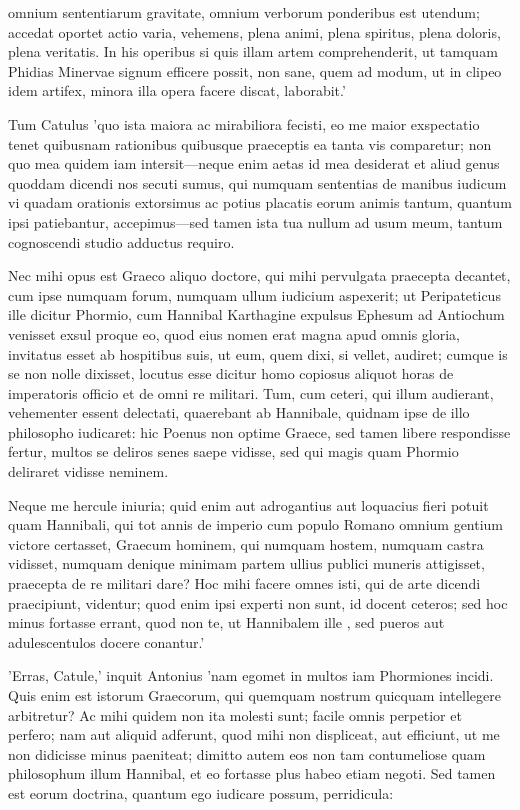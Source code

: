  omnium sententiarum gravitate, omnium verborum ponderibus est utendum; accedat oportet actio varia, vehemens, plena animi, plena spiritus, plena doloris, plena veritatis. In his operibus si quis illam artem comprehenderit, ut tamquam Phidias Minervae signum efficere possit, non sane, quem ad modum, ut in clipeo idem artifex, minora illa opera facere discat, laborabit.'

 Tum Catulus 'quo ista maiora ac mirabiliora fecisti, eo me maior exspectatio tenet quibusnam rationibus quibusque praeceptis ea tanta vis comparetur; non quo mea quidem iam intersit—neque enim aetas id mea desiderat et aliud genus quoddam dicendi nos secuti sumus, qui numquam sententias de manibus iudicum vi quadam orationis extorsimus ac potius placatis eorum animis tantum, quantum ipsi patiebantur, accepimus—sed tamen ista tua nullum ad usum meum, tantum cognoscendi studio adductus requiro.

 Nec mihi opus est Graeco aliquo doctore, qui mihi pervulgata praecepta decantet, cum ipse numquam forum, numquam ullum iudicium aspexerit; ut Peripateticus ille dicitur Phormio, cum Hannibal Karthagine expulsus Ephesum ad Antiochum venisset exsul proque eo, quod eius nomen erat magna apud omnis gloria, invitatus esset ab hospitibus suis, ut eum, quem dixi, si vellet, audiret; cumque is se non nolle dixisset, locutus esse dicitur homo copiosus aliquot horas de imperatoris officio et de omni re militari. Tum, cum ceteri, qui illum audierant, vehementer essent delectati, quaerebant ab Hannibale, quidnam ipse de illo philosopho iudicaret: hic Poenus non optime Graece, sed tamen libere respondisse fertur, multos se deliros senes saepe vidisse, sed qui magis quam Phormio deliraret vidisse neminem.

 Neque me hercule iniuria; quid enim aut adrogantius aut loquacius fieri potuit quam Hannibali, qui tot annis de imperio cum populo Romano omnium gentium victore certasset, Graecum hominem, qui numquam hostem, numquam castra vidisset, numquam denique minimam partem ullius publici muneris attigisset, praecepta de re militari dare? Hoc mihi facere omnes isti, qui de arte dicendi praecipiunt, videntur; quod enim ipsi experti non sunt, id docent ceteros; sed hoc minus fortasse errant, quod non te, ut Hannibalem ille , sed pueros aut adulescentulos docere conantur.'

 'Erras, Catule,' inquit Antonius 'nam egomet in multos iam Phormiones incidi. Quis enim est istorum Graecorum, qui quemquam nostrum quicquam intellegere arbitretur? Ac mihi quidem non ita molesti sunt; facile omnis perpetior et perfero; nam aut aliquid adferunt, quod mihi non displiceat, aut efficiunt, ut me non didicisse minus paeniteat; dimitto autem eos non tam contumeliose quam philosophum illum Hannibal, et eo fortasse plus habeo etiam negoti. Sed tamen est eorum doctrina, quantum ego iudicare possum, perridicula:

